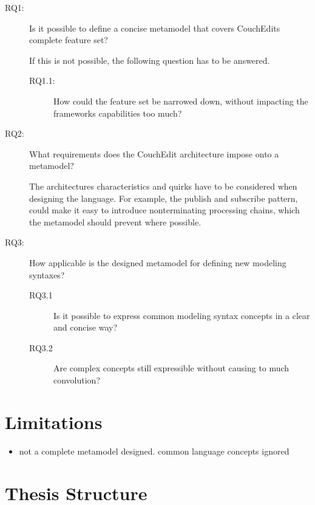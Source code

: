 \begin{description}
  \item[RQ1:] Is it possible to define a concise metamodel that covers CouchEdits complete feature set?

        If this is not possible, the following question has to be answered.
        \begin{description}
          \item[RQ1.1:] How could the feature set be narrowed down, without impacting the frameworks capabilities too much?
        \end{description}

  \item[RQ2:] What requirements does the CouchEdit architecture impose onto a metamodel?

        The architectures characteristics and quirks have to be considered when designing the language. For example, the publish and subscribe pattern, could make it easy to introduce nonterminating processing chains, which the metamodel should prevent where possible.

  \item[RQ3:] How applicable is the designed metamodel for defining new modeling syntaxes?

        \begin{description}
          \item[RQ3.1] Is it possible to express common modeling syntax concepts in a clear and concise way?
          \item[RQ3.2] Are complex concepts still expressible without causing to much convolution?
        \end{description}
\end{description}


\section{Limitations}
\comment{\dots}
\begin{itemize}
  \item not a complete metamodel designed. common language concepts ignored
\end{itemize}

\section{Thesis Structure}
\comment{\dots}